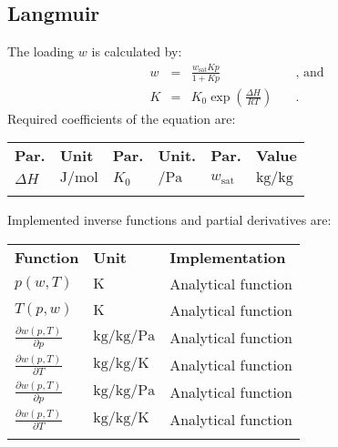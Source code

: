 %
\subsection{Langmuir}
\label{cha:approaches:ads:sur:langmuir}
%
The loading $w$ is calculated by:
%
\begin{equation*}
	\begin{split}
		w &=& \frac{w_\mathrm{sat} K p}{1 + K p} & \quad\text{, and} \\
		K &=& K_0 \exp \left( \frac{\Delta H}{R T} \right) & \quad\text{.}
	\end{split}
\end{equation*}
Required coefficients of the equation are:
%
\begin{longtable}[l]{ll|ll|ll}
\toprule
\addlinespace
\textbf{Par.} & \textbf{Unit} & \textbf{Par.} &	\textbf{Unit.} & \textbf{Par.} & \textbf{Value} \\
\addlinespace
\midrule
\endhead

\bottomrule
\endfoot
\bottomrule
\endlastfoot
\addlinespace

$\Delta H$ & $\si{\joule\per\mole}$ & $K_0$ & $\si{\per\pascal}$ & $w_\mathrm{sat}$ & $\si{\kilogram\per\kilogram}$ \\

\addlinespace
\end{longtable}
%
Implemented inverse functions and partial derivatives are:
%
\begin{longtable}[l]{l|l|p{7.5cm}}
	\toprule
	\addlinespace
	\textbf{Function} & \textbf{Unit} &	\textbf{Implementation} \\
	\addlinespace
	\midrule
	\endhead
	
	\bottomrule
	\endfoot
	\bottomrule
	\endlastfoot
	\addlinespace
	
	$p(w,T)$	& $\si{\kelvin}$ & Analytical function\\
	$T(p,w)$	& $\si{\kelvin}$ & Analytical function\\
	$\frac{\partial w(p,T)}{\partial p}$	& $\si{\kilogram\per\kilogram\per\pascal}$ & Analytical function\\
	$\frac{\partial w(p,T)}{\partial T}$	& $\si{\kilogram\per\kilogram\per\kelvin}$ & Analytical function\\
	$\frac{\partial w(p,T)}{\partial p}$	& $\si{\kilogram\per\kilogram\per\pascal}$ & Analytical function\\
	$\frac{\partial w(p,T)}{\partial T}$	& $\si{\kilogram\per\kilogram\per\kelvin}$ & Analytical function\\
	
	\addlinespace
\end{longtable}
%
